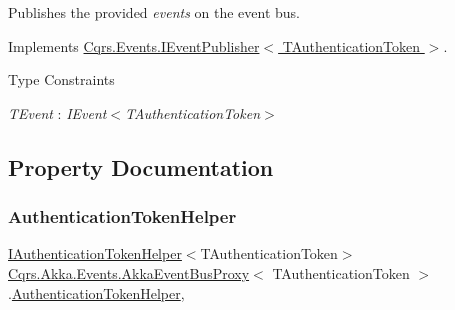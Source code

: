 Publishes the provided {\itshape events}  on the event bus. 



Implements \hyperlink{interfaceCqrs_1_1Events_1_1IEventPublisher_a2cbcc3d2c24d015abef6337714ec51ff_a2cbcc3d2c24d015abef6337714ec51ff}{Cqrs.\+Events.\+I\+Event\+Publisher$<$ T\+Authentication\+Token $>$}.

\begin{Desc}
\item[Type Constraints]\begin{description}
\item[{\em T\+Event} : {\em I\+Event$<$T\+Authentication\+Token$>$}]\end{description}
\end{Desc}


\subsection{Property Documentation}
\mbox{\label{classCqrs_1_1Akka_1_1Events_1_1AkkaEventBusProxy_a54964db320ef21b0564e66e9f258f694_a54964db320ef21b0564e66e9f258f694}} 
\subsubsection{\texorpdfstring{Authentication\+Token\+Helper}{AuthenticationTokenHelper}}
{\footnotesize\ttfamily \hyperlink{interfaceCqrs_1_1Authentication_1_1IAuthenticationTokenHelper}{I\+Authentication\+Token\+Helper}$<$T\+Authentication\+Token$>$ \hyperlink{classCqrs_1_1Akka_1_1Events_1_1AkkaEventBusProxy}{Cqrs.\+Akka.\+Events.\+Akka\+Event\+Bus\+Proxy}$<$ T\+Authentication\+Token $>$.\hyperlink{classCqrs_1_1Authentication_1_1AuthenticationTokenHelper}{Authentication\+Token\+Helper}\hspace{0.3cm}{\ttfamily [get]}, {\ttfamily [protected]}}

\mbox{\label{classCqrs_1_1Akka_1_1Events_1_1AkkaEventBusProxy_a4cc4ec0ece94393246b0c64f02d55f41_a4cc4ec0ece94393246b0c64f02d55f41}} 
